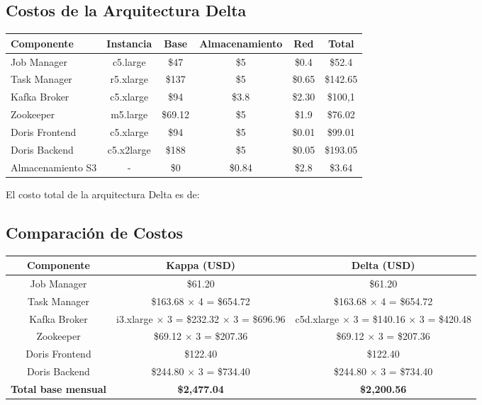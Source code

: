 \newpage


\subsection{Costos de la Arquitectura Delta}

\begin{longtable}{|p{3cm}|c|c|c|c|c|}
    \hline
    \textbf{Componente} & \textbf{Instancia} & \textbf{Base} & \textbf{Almacenamiento} & \textbf{Red} & \textbf{Total} \\
    \hline
    Job Manager & c5.large & \$47 & \$5 & \$0.4 & \$52.4 \\
    \hline
    Task Manager & r5.xlarge & \$137 & \$5 & \$0.65 & \$142.65 \\
    \hline
    Kafka Broker & c5.xlarge & \$94 & \$3.8 & \$2.30 & \$100,1 \\
    \hline
    Zookeeper & m5.large & \$69.12 & \$5 & \$1.9 & \$76.02 \\
    \hline
    Doris Frontend & c5.xlarge & \$94 & \$5 & \$0.01 & \$99.01 \\
    \hline
    Doris Backend & c5.x2large & \$188 & \$5 & \$0.05 & \$193.05 \\
    \hline
    Almacenamiento S3 & - & \$0 & \$0.84 & \$2.8 & \$3.64 \\
    \hline
\end{longtable}

El costo total de la arquitectura Delta es de:
\newline
\newline
{}
\newpage

\subsection{Comparación de Costos}

\begin{longtable}{|c|c|c|}
    \hline
    \textbf{Componente} & \textbf{Kappa (USD)} & \textbf{Delta (USD)} \\
    \hline
    Job Manager & \$61.20 & \$61.20 \\
    \hline
    Task Manager & \$163.68 × 4 = \$654.72 & \$163.68 × 4 = \$654.72 \\
    \hline
    Kafka Broker & i3.xlarge × 3 = \$232.32 × 3 = \$696.96 & c5d.xlarge × 3 = \$140.16 × 3 = \$420.48 \\
    \hline
    Zookeeper & \$69.12 × 3 = \$207.36 & \$69.12 × 3 = \$207.36 \\
    \hline
    Doris Frontend & \$122.40 & \$122.40 \\
    \hline
    Doris Backend & \$244.80 × 3 = \$734.40 & \$244.80 × 3 = \$734.40 \\
    \hline
    \textbf{Total base mensual} & \textbf{\$2,477.04} & \textbf{\$2,200.56} \\
    \hline
\end{longtable}


